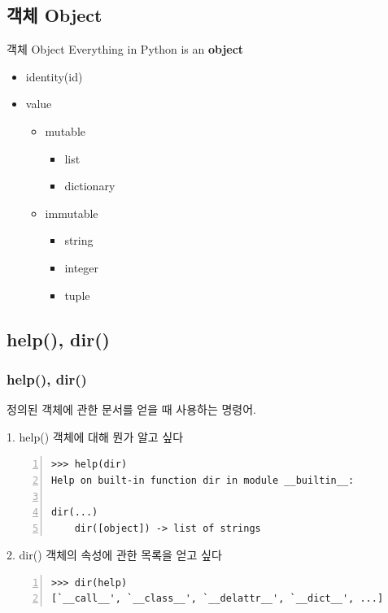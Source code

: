 \documentclass[10pt]{beamer}
\begin{document}
\subsection{객체 Object}
\begin{frame}{객체 Object}
\Large{Everything in Python is an \textbf{object}}
	\begin{itemize}
		\item identity(id)
		\item value
		\begin{itemize}
			\item mutable
			\begin{itemize}
				\item list
				\item dictionary
			\end{itemize}
			\item immutable
			\begin{itemize}
				\item string
				\item integer
				\item tuple
			\end{itemize}
		\end{itemize}
	\end{itemize}
\end{frame}

\subsection{help(), dir()}
\begin{frame}[fragile]
\frametitle{help(), dir()}
정의된 객체에 관한 문서를 얻을 때 사용하는 명령어.\\
\begin{block}{1. help()}
	객체에 대해 뭔가 알고 싶다
\end{block}
\begin{Verbatim}[numbers=left,commandchars=\\\{\}]
>>> help(dir)
Help on built-in function dir in module __builtin__:

dir(...)
    dir([object]) -> list of strings
\end{Verbatim}
\begin{block}{2. dir()}
	객체의 속성에 관한 목록을 얻고 싶다
\end{block}
\begin{Verbatim}[numbers=left,commandchars=\\\{\}]
>>> dir(help)
[`__call__', `__class__', `__delattr__', `__dict__', ...]
\end{Verbatim}
\end{frame}
\end{document}

